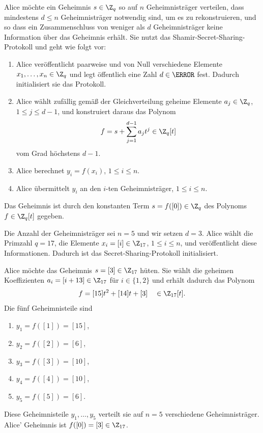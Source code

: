 \begin{construction}
 Alice möchte ein Geheimnis $s \in \Z_q$ so auf $n$ Geheimnisträger verteilen, dass mindestens $d \leq n$ Geheimnisträger notwendig sind, um es zu rekonstruieren, und so dass ein Zusammenschluss von weniger als $d$ Geheimnisträger keine Information über das Geheimnis erhält. Sie nutzt das Shamir-Secret-Sharing-Protokoll und geht wie folgt vor:
 
 \begin{enumerate}
  \item Alice veröffentlicht paarweise und von Null verschiedene Elemente $x_1, \dots, x_n \in \Z_q$ und legt öffentlich eine Zahl $d \in \N$ fest. Dadurch initialisiert sie das Protokoll.
  \item Alice wählt zufällig gemäß der Gleichverteilung geheime Elemente $a_j \in \Z_q$, $1 \leq j \leq d-1$, und konstruiert daraus das Polynom
  \[f = s + \sum_{j=1}^{d-1} a_jt^j \in \Z_q[t]\]
  vom Grad höchstens $d-1$.
  \item Alice berechnet $y_i = f(x_i)$, $1 \leq i \leq n$.
  \item Alice übermittelt $y_i$ an den $i$-ten Geheimnisträger, $1 \leq i \leq n$.
 \end{enumerate}
 
 Das Geheimnis ist durch den konstanten Term $s = f([0]) \in \Z_q$ des Polynoms $f \in \Z_q[t]$ gegeben. 
 
  \begin{example}
  Die Anzahl der Geheimnisträger sei $n = 5$ und wir setzen $d = 3$. Alice wählt die Primzahl $q = 17$, die Elemente $x_i = [i] \in \Z_{17}$, $1 \leq i \leq n$, und veröffentlicht diese Informationen. Dadurch ist das Secret-Sharing-Protokoll initialisiert. 
  
  Alice möchte das Geheimnis $s = [3] \in \Z_{17}$ hüten. Sie wählt die geheimen Koeffizienten $a_i = [i + 13] \in \Z_{17}$ für $i \in \{1, 2\}$ und erhält dadurch das Polynom
  \[f = [15]t^2 + [14]t + [3] \quad \in \Z_{17}[t].\]
  Die fünf Geheimnisteile sind 
  \begin{enumerate}[columns=2]
  \item $y_1 = f([1]) = [15]$, 
  \item $y_2 = f([2]) = [6]$, 
  \item $y_3 = f([3]) = [10]$, 
  \item $y_4 = f([4]) = [10]$,
  \item $y_5 = f([5]) = [6]$.
  \end{enumerate}
 Diese Geheimnisteile $y_1, \dots, y_5$ verteilt sie auf $n=5$ verschiedene Geheimnisträger. Alice' Geheimnis ist $f([0]) = [3] \in \Z_{17}$.
 \end{example}
 

\end{construction}
